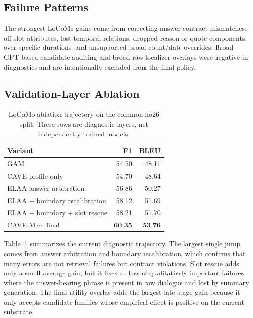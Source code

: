 \documentclass[conference]{IEEEtran}
\newcommand{\method}{CAVE-Mem}
\begin{document}
\subsection{Failure Patterns}
The strongest LoCoMo gains come from correcting answer-contract mismatches:
off-slot attributes, lost temporal relations, dropped reason or quote
components, over-specific durations, and unsupported broad count/date
overrides. Broad GPT-based candidate auditing and broad raw-localizer overlays
were negative in diagnostics and are intentionally excluded from the final
policy.

\subsection{Validation-Layer Ablation}
\begin{table}[t]
\caption{LoCoMo ablation trajectory on the common no26 split. These rows are
diagnostic layers, not independently trained models.}
\label{tab:ablation}
\centering
\scriptsize
\begin{tabular}{lrr}
\toprule
Variant & F1 & BLEU \\
\midrule
GAM & 54.50 & 48.11 \\
CAVE profile only & 54.70 & 48.64 \\
ELAA answer arbitration & 56.86 & 50.27 \\
ELAA + boundary recalibration & 58.12 & 51.69 \\
ELAA + boundary + slot rescue & 58.21 & 51.70 \\
\method{} final & \textbf{60.35} & \textbf{53.76} \\
\bottomrule
\end{tabular}
\end{table}

Table~\ref{tab:ablation} summarizes the current diagnostic trajectory. The
largest single jump comes from answer arbitration and boundary recalibration,
which confirms that many errors are not retrieval failures but contract
violations. Slot rescue adds only a small average gain, but it fixes a class of
qualitatively important failures where the answer-bearing phrase is present in
raw dialogue and lost by summary generation. The final utility overlay adds
the largest late-stage gain because it only accepts candidate families whose
empirical effect is positive on the current substrate.
\end{document}
